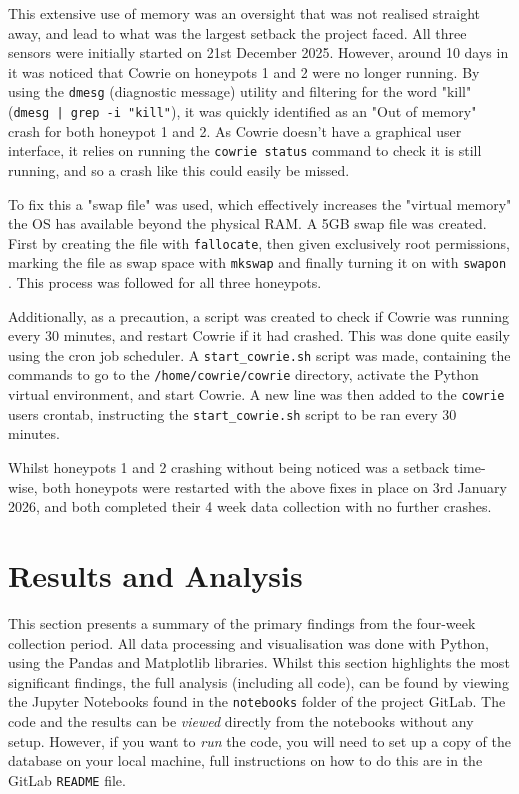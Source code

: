 \documentclass[]{article}
\begin{document}
This extensive use of memory was an oversight that was not realised straight away, and lead to what was the largest setback the project faced. All three sensors were initially started on 21st December 2025. However, around 10 days in it was noticed that Cowrie on honeypots 1 and 2 were no longer running. By using the \texttt{dmesg} (diagnostic message) utility and filtering for the word "kill" (\texttt{dmesg | grep -i "kill"}), it was quickly identified as an "Out of memory" crash for both honeypot 1 and 2. As Cowrie doesn't have a graphical user interface, it relies on running the \texttt{cowrie status} command to check it is still running, and so a crash like this could easily be missed.

To fix this a "swap file" was used, which effectively increases the "virtual memory" the OS has available beyond the physical RAM. A 5GB swap file was created. First by creating the file with \texttt{fallocate}, then given exclusively root permissions, marking the file as swap space with \texttt{mkswap} and finally turning it on with \texttt{swapon} \cite{swapfile}. This process was followed for all three honeypots.

Additionally, as a precaution, a script was created to check if Cowrie was running every 30 minutes, and restart Cowrie if it had crashed. This was done quite easily using the cron job scheduler. A \texttt{start\_cowrie.sh} script was made, containing the commands to go to the \texttt{/home/cowrie/cowrie} directory, activate the Python virtual environment, and start Cowrie. A new line was then added to the \texttt{cowrie} users crontab, instructing the \texttt{start\_cowrie.sh} script to be ran every 30 minutes.

Whilst honeypots 1 and 2 crashing without being noticed was a setback time-wise, both honeypots were restarted with the above fixes in place on 3rd January 2026, and both completed their 4 week data collection with no further crashes.

\section{Results and Analysis}

This section presents a summary of the primary findings from the four-week collection period. All data processing and visualisation was done with Python, using the Pandas and Matplotlib libraries. Whilst this section highlights the most significant findings, the full analysis (including all code), can be found by viewing the Jupyter Notebooks found in the \texttt{notebooks} folder of the project GitLab. The code and the results can be \textit{viewed} directly from the notebooks without any setup. However, if you want to \textit{run} the code, you will need to set up a copy of the database on your local machine, full instructions on how to do this are in the GitLab \texttt{README} file.
\end{document}
